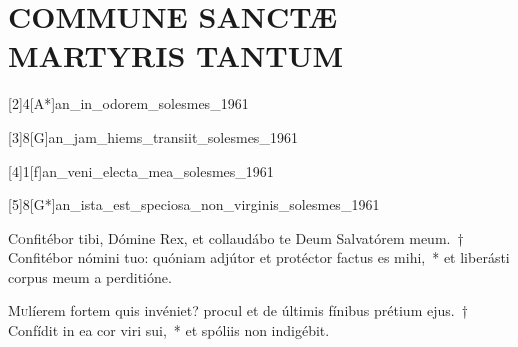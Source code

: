\documentclass[vesperale_romanum.tex]{subfiles}
\begin{document}
\section[Commune non Virginum]{COMMUNE SANCTÆ MARTYRIS TANTUM}
\subtitle{et nec Virginis nec Martyris.}




[2]{4}[A*]{an_in_odorem_solesmes_1961}

[3]{8}[G]{an_jam_hiems_transiit_solesmes_1961}

[4]{1}[f]{an_veni_electa_mea_solesmes_1961}

[5]{8}[G*]{an_ista_est_speciosa_non_virginis_solesmes_1961}



\lettrine{C}{o}nfitébor tibi, Dómine Rex, et collaudábo te Deum Salvatórem meum.~† Confitébor nómini tuo: quóniam adjútor et protéctor factus es mihi,~* et liberásti corpus meum a perditióne.


\lettrine{M}{u}líerem fortem quis invéniet? procul et de últimis fínibus prétium ejus.~† Confídit in ea cor viri sui,~* et spóliis non indigébit.







\end{document}
